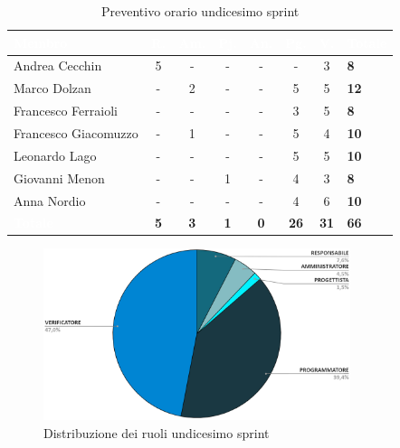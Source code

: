 {
\setlength{\tabcolsep}{10pt}
\renewcommand{\arraystretch}{1.5}
\begin{table}[h!]
    \centering
    \begin{tabularx}{\textwidth}{| l | c | c | c | c | c | c | X |}
        \hline
        \rowcolor{headerrow} \textbf{\textcolor{white}{Membro}} & \textbf{\textcolor{white}{R.}} & \textbf{\textcolor{white}{Am.}} & \textbf{\textcolor{white}{Pj.}} & \textbf{\textcolor{white}{An.}} & \textbf{\textcolor{white}{Pg.}} & \textbf{\textcolor{white}{V.}} & \textbf{\textcolor{white}{Totale}} \\
        \hline
        Andrea Cecchin & 5 & - & - & - & - & 3 & \textbf{8} \\
        \hline
        Marco Dolzan & - & 2 & - & - & 5 & 5 & \textbf{12}  \\
        \hline
        Francesco Ferraioli & - & - & - & - & 3 & 5 & \textbf{8} \\
        \hline  
        Francesco Giacomuzzo & - & 1 & - & - & 5 & 4 & \textbf{10}  \\
        \hline
        Leonardo Lago & - & - & - & - & 5 & 5 & \textbf{10} \\
        \hline
        Giovanni Menon & - & - & 1 & - & 4 & 3 & \textbf{8}  \\
        \hline
        Anna Nordio & - & - & - & - & 4 & 6 & \textbf{10}  \\
        \hline
    \cellcolor{headerrow} \textbf{\textcolor{white}{Totale}} & \textbf{5} & \textbf{3} & \textbf{1} & \textbf{0} & \textbf{26} & \textbf{31} & \textbf{66} \\
        \hline
    \end{tabularx} 
    \caption{Preventivo orario undicesimo sprint}
    \label{tab:preventivoorario11sprint}
\end{table}
}

\begin{figure}[h!]
    \centering
    \includegraphics[width=0.8\textwidth]{prev11ruoli.png}
    \caption{Distribuzione dei ruoli undicesimo sprint}
    \label{fig:preventivoorario11sprint}
\end{figure}


